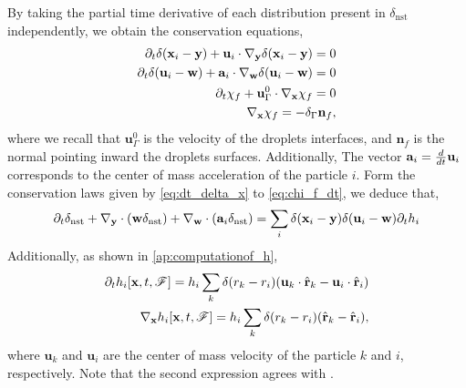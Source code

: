 By taking the partial time derivative of each distribution present in $\delta_\text{nst}$ independently, we obtain the conservation equations, 
\begin{align}
    \label{eq:dt_delta_x}
    \pddt \delta(\textbf{x}_i  - \textbf{y})
    +\textbf{u}_i  
    \cdot \pddy \delta(\textbf{x}_i  - \textbf{y})
    = 0\\
    \pddt \delta(\textbf{u}_i -\textbf{w})
    +\textbf{a}_i \cdot  \pddw   \delta(\textbf{u}_i  - \textbf{w})
    = 0\\
    \pddt \chi_f 
    + \textbf{u}_\Gamma^0 
    \cdot \pddx \chi_f = 0 \\
    \pddx \chi_f = - \delta_\Gamma \textbf{n}_f,
    \label{eq:chi_f_dt}
\end{align}
where we recall that $\textbf{u}_\Gamma^0$ is the velocity of the droplets interfaces, and $\textbf{n}_f$ is the normal pointing inward the droplets surfaces. 
Additionally, The vector $\textbf{a}_i = \frac{d}{dt} \textbf{u}_i$ corresponds to the center of mass acceleration of the particle $i$. 
Form the conservation laws given by \ref{eq:dt_delta_x} to \ref{eq:chi_f_dt}, we deduce that, 
\begin{align}
    \partial_t \delta_\text{nst}
    + {\mathbf{\nabla}_\textbf{y}} \cdot (\textbf{w} \delta_\text{nst})
    + {\mathbf{\nabla}_\textbf{w}} \cdot (\textbf{a}_i  \delta_\text{nst})
    = 
    \sum_i \delta(\textbf{x}_i -\textbf{y}) \delta(\textbf{u}_i - \textbf{w}) \partial_t h_i
\end{align}
Additionally, as shown in \ref{ap:computationof_h}, 
\begin{align}
    \pddt  h_i[\textbf{x},t,\FF]
    = 
    h_i
    \sum_k 
    \delta(r_k - r_i)
    (\textbf{u}_k  \cdot \hat{\textbf{r}}_k - \textbf{u}_i  \cdot \hat{\textbf{r}}_i)\\
    \pddx  h_i[\textbf{x},t,\FF]
    = 
    h_i
    \sum_k 
    \delta(r_k - r_i)
    ( \hat{\textbf{r}}_k -  \hat{\textbf{r}}_i),
    \label{eq:dt_h_i}
\end{align}
where $\textbf{u}_k$ and $\textbf{u}_i$  are the center of mass velocity of the particle $k$ and $i$, respectively.
Note that the second expression agrees with \citet[Appendix A]{zhang2021ensemble}. 
